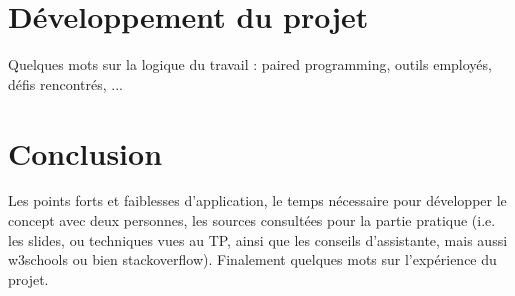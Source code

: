 \documentclass[a4paper,12pt]{article}
\begin{document}
\newpage

\section{Développement du projet}

Quelques mots sur la logique du travail : paired programming, outils employés, défis rencontrés, ...

\newpage
\section{Conclusion}

Les points forts et faiblesses d’application, le temps nécessaire pour développer le concept avec deux personnes, les sources consultées pour la partie pratique (i.e. les slides, ou techniques vues au TP, ainsi que les conseils d’assistante, mais aussi w3schools ou bien stackoverflow).
Finalement quelques mots sur l'expérience du projet.




\newpage

%
%

\end{document}
